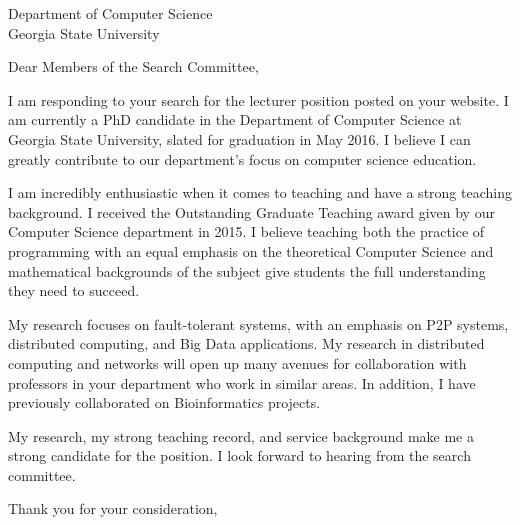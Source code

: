 \documentclass[12pt]{letter}
\date{}
\begin{document}
 
\begin{letter}{Department of Computer Science\\Georgia State University } 
\opening{Dear Members of the Search Committee,} 
 
I am responding to your search for the lecturer position posted on your website.
I am currently a PhD candidate in the Department of Computer Science at Georgia State University, slated for graduation in May 2016.
I believe I can greatly contribute to our department's focus on computer science education.


I am incredibly enthusiastic when it comes to teaching and have a strong teaching background.
I received the Outstanding Graduate Teaching award given by our Computer Science department in 2015.
I believe teaching both the practice of programming with an equal emphasis on the theoretical Computer Science and mathematical backgrounds of the subject give students the full understanding they need to succeed.



My research focuses on fault-tolerant systems, with an emphasis on P2P systems, distributed computing, and Big Data applications.
My research in distributed computing and networks will open up many avenues for collaboration with professors in your department who work in similar areas.
In addition, I have previously collaborated on Bioinformatics projects.







My research, my strong teaching record, and service background make me a strong candidate for the position.
I look forward to hearing from the search committee.


\closing{Thank you for your consideration,} 
\end{letter} 
\end{document}
